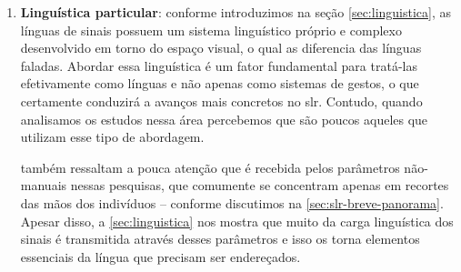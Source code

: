 \begin{enumerate}



      \item \textbf{Linguística particular}: conforme introduzimos na seção \autoref{sec:linguistica}, as línguas de sinais possuem um sistema linguístico próprio e complexo desenvolvido em torno do espaço visual, o qual as diferencia das línguas faladas.
            Abordar essa linguística é um fator fundamental para tratá-las efetivamente como línguas e não apenas como sistemas de gestos, o que certamente conduzirá a avanços mais concretos no \acrshort{slr}. Contudo, quando analisamos os estudos nessa área percebemos que são poucos aqueles que utilizam esse tipo de abordagem.

             também ressaltam a pouca atenção que é recebida pelos parâmetros não-manuais nessas pesquisas, que comumente se concentram apenas em recortes das mãos dos indivíduos -- conforme discutimos na \autoref{sec:slr-breve-panorama}.
            Apesar disso, a \autoref{sec:linguistica} nos mostra que muito da carga linguística dos sinais é transmitida através desses parâmetros e isso os torna elementos essenciais da língua que precisam ser endereçados.




\end{enumerate}
